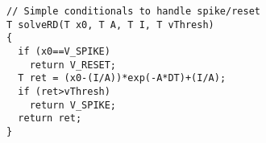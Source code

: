 \documentclass[a4paper,12pt]{article}
\begin{document}
\begin{verbatim}
// Simple conditionals to handle spike/reset
T solveRD(T x0, T A, T I, T vThresh)
{
  if (x0==V_SPIKE)
    return V_RESET;
  T ret = (x0-(I/A))*exp(-A*DT)+(I/A);
  if (ret>vThresh)
    return V_SPIKE;
  return ret;
}
\end{verbatim}
\end{document}
